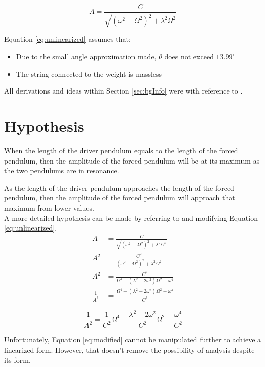 \documentclass[letterpaper, 12pt]{article}
\begin{document}
\begin{equation} \label{eq:unlinearized}
    A = \frac{C}{\sqrt{(\omega^2 - \Omega^2)^2 + \lambda^2\Omega^2}}
\end{equation}

Equation \ref*{eq:unlinearized} assumes that:
\begin{itemize}
    \item Due to the small angle approximation made, \(\theta\) does not exceed \(13.99^{\circ}\)
    \item The string connected to the weight is massless
\end{itemize}

All derivations and ideas within Section \ref*{sec:bgInfo} were with reference to \cite{chasnov11DampedDriven2022}.

\section{Hypothesis}

When the length of the driver pendulum equals to the length of the forced pendulum,
then the amplitude of the forced pendulum will be at its maximum as the two pendulums
are in resonance.

As the length of the driver pendulum approaches the length of the forced pendulum,
then the amplitude of the forced pendulum will approach that maximum from lower values.
\\

A more detailed hypothesis can be made by referring to and modifying Equation \ref*{eq:unlinearized}.
\begin{align*}
    A             & = \frac{C}{\sqrt{(\omega^2 - \Omega^2)^2 + \lambda^2\Omega^2}}
    \\
    A^2           & = \frac{C^2}{(\omega^2 - \Omega^2)^2 + \lambda^2\Omega^2}
    \\
    A^2           & = \frac{C^2}{\Omega^4 + (\lambda^2 - 2\omega^2)\Omega^2 + \omega^4}
    \\
    \frac{1}{A^2} & = \frac{\Omega^4 + (\lambda^2 - 2\omega^2)\Omega^2 + \omega^4}{C^2}
\end{align*}

\begin{equation} \label{eq:modified}
    \frac{1}{A^2} = \frac{1}{C^2}\Omega^4 + \frac{\lambda^2 - 2\omega^2}{C^2}\Omega^2 + \frac{\omega^4}{C^2}
\end{equation}

Unfortunately, Equation \ref*{eq:modified} cannot be manipulated further
to achieve a linearized form. However, that doesn't remove
the possibility of analysis despite its form.
\end{document}
